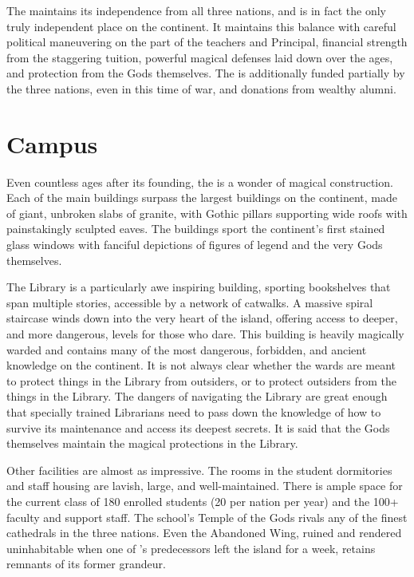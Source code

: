 \documentclass[blue]{GL2020}
\begin{document}
The \pSc{} maintains its independence from all three nations, and is in fact the only truly independent place on the continent. It maintains this balance with careful political maneuvering on the part of the teachers and Principal, financial strength from the staggering tuition, powerful magical defenses laid down over the ages, and protection from the Gods themselves. The \pSc{} is additionally funded partially by the three nations, even in this time of war, and donations from wealthy alumni.

\section*{Campus}
Even countless ages after its founding, the \pSchool{} is a wonder of magical construction. Each of the main buildings surpass the largest buildings on the continent, made of giant, unbroken slabs of granite, with Gothic pillars supporting wide roofs with painstakingly sculpted eaves. The buildings sport the continent’s first stained glass windows with fanciful depictions of figures of legend and the very Gods themselves.

The Library is a particularly awe inspiring building, sporting bookshelves that span multiple stories, accessible by a network of catwalks. A massive spiral staircase winds down into the very heart of the island, offering access to deeper, and more dangerous, levels for those who dare. This building is heavily magically warded and contains many of the most dangerous, forbidden, and ancient knowledge on the continent. It is not always clear whether the wards are meant to protect things in the Library from outsiders, or to protect outsiders from the things in the Library. The dangers of navigating the Library are great enough that specially trained Librarians need to pass down the knowledge of how to survive its maintenance and access its deepest secrets. It is said that the Gods themselves maintain the magical protections in the Library.

Other facilities are almost as impressive. The rooms in the student dormitories and staff housing are lavish, large, and well-maintained. There is ample space for the current class of 180 enrolled students (20 per nation per year) and the 100+ faculty and support staff. The school’s Temple of the Gods rivals any of the finest cathedrals in the three nations. Even the Abandoned Wing, ruined and rendered uninhabitable when one of \cPrincipal{}'s predecessors left the island for a week, retains remnants of its former grandeur.
\end{document}
